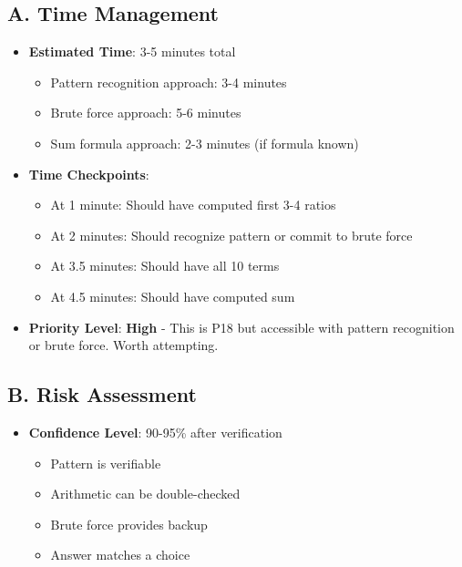 \documentclass[12pt]{article}
\begin{document}
\begin{competitionbox}
\subsection*{A. Time Management}
\begin{itemize}[leftmargin=*]
    \item \textbf{Estimated Time}: 3-5 minutes total
    \begin{itemize}
        \item Pattern recognition approach: 3-4 minutes
        \item Brute force approach: 5-6 minutes
        \item Sum formula approach: 2-3 minutes (if formula known)
    \end{itemize}
    
    \item \textbf{Time Checkpoints}: 
    \begin{itemize}
        \item At 1 minute: Should have computed first 3-4 ratios
        \item At 2 minutes: Should recognize pattern or commit to brute force
        \item At 3.5 minutes: Should have all 10 terms
        \item At 4.5 minutes: Should have computed sum
    \end{itemize}
    
    \item \textbf{Priority Level}: \textbf{High} - This is P18 but accessible with pattern recognition or brute force. Worth attempting.
\end{itemize}

\subsection*{B. Risk Assessment}
\begin{itemize}[leftmargin=*]
    \item \textbf{Confidence Level}: 90-95\% after verification
    \begin{itemize}
        \item Pattern is verifiable
        \item Arithmetic can be double-checked
        \item Brute force provides backup
        \item Answer matches a choice
    \end{itemize}
    

\end{itemize}
\end{competitionbox}
\end{document}
